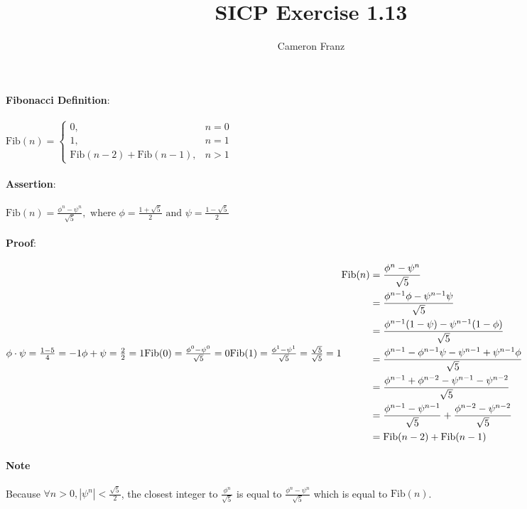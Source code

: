 \documentclass{article}
\begin{document}
\setlength{\droptitle}{-7em}


\title{SICP Exercise 1.13}
\author{Cameron Franz}

\newcommand{\Fib}{\text{Fib}}

\maketitle
\noindent
\textbf{Fibonacci Definition}: \\ \\
$
	\Fib(n) = \begin{cases}
		0, & n=0 \\
		1, & n=1 \\
		\Fib(n-2) + \Fib(n-1), & n>1 
	\end{cases}
$
\\ \\
\textbf{Assertion}: \\ \\
$
	\Fib(n) = \frac{\phi^n-\psi^n}{\sqrt{5}}, \text{ where } \phi = \frac{1 + \sqrt{5}}{2} \text{ and } \psi = \frac{1 - \sqrt{5}}{2}
$
\\ \\
\textbf{Proof}: \\ \\
$
\phi \cdot \psi = \frac{1 - 5}{4} = -1
\\ \\
\phi + \psi = \frac{2}{2} = 1
\\ \\
\Fib(0) = \frac{\phi^0-\psi^0}{\sqrt{5}} = 0
\\ \\
\Fib(1) = \frac{\phi^1-\psi^1}{\sqrt{5}} = \frac{\sqrt{5}}{\sqrt{5}} =1
\\ \\
\begin{aligned}
\Fib(n) & = \frac{\phi^n-\psi^n}{\sqrt{5}} \\ 
		& = \frac{\phi^{n-1}\phi - \psi^{n-1}\psi}{\sqrt{5}} \\
		& = \frac{\phi^{n-1}(1-\psi)-\psi^{n-1}(1-\phi)}{\sqrt{5}} \\
		& = \frac{\phi^{n-1}-\phi^{n-1}\psi - \psi^{n-1}+\psi^{n-1}\phi}{\sqrt{5}} \\
		& = \frac{\phi^{n-1} + \phi^{n-2}-\psi^{n-1}-\psi^{n-2}}{\sqrt{5}} \\
		& = \frac{\phi ^ {n-1} - \psi ^ {n-1}}{\sqrt{5}} + \frac{\phi ^ {n-2} - \psi ^ {n-2}}{\sqrt{5}} \\
		& = \Fib(n-2) + \Fib(n-1)\\
\end{aligned}
$
\\ \\
\textbf{Note} \\ \\
Because $\forall n > 0,  |\psi^n| < \frac{\sqrt{5}}{2}$, the closest integer to $\frac{\phi^n}{\sqrt{5}}$ is equal to $\frac{\phi^n-\psi^n}{\sqrt{5}}$ which is equal to $\Fib(n)$.
\end{document}
